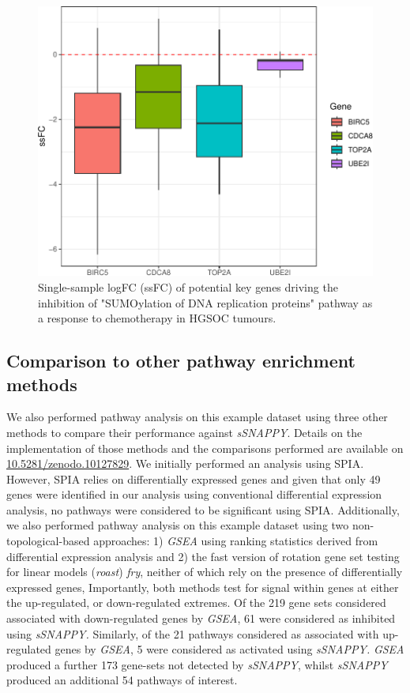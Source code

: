 \documentclass[9pt,a4paper,]{extarticle}
\begin{document}
\begin{figure}

{\centering \includegraphics[width=0.8\linewidth]{sSNAPPY_paper_files/figure-latex/Figure8-1} 

}

\caption{Single-sample logFC (ssFC) of potential key genes driving the inhibition of "SUMOylation of DNA replication proteins" pathway as a response to chemotherapy in HGSOC tumours.}\label{fig:Figure8}
\end{figure}

\hypertarget{comparison-to-other-pathway-enrichment-methods}{%
\subsection{Comparison to other pathway enrichment methods}\label{comparison-to-other-pathway-enrichment-methods}}

We also performed pathway analysis on this example dataset using three other methods to compare their performance against \emph{sSNAPPY}.
Details on the implementation of those methods and the comparisons performed are available on \href{https://zenodo.org/doi/10.5281/zenodo.10059951}{10.5281/zenodo.10127829}.
We initially performed an analysis using SPIA\citep{Tarca2009}.
However, SPIA relies on differentially expressed genes and given that only 49 genes were identified in our analysis using conventional differential expression analysis, no pathways were considered to be significant using SPIA.
Additionally, we also performed pathway analysis on this example dataset using two non-topological-based approaches: 1) \emph{GSEA}\citep{Subramanian2005-lx} using ranking statistics derived from differential expression analysis and 2) the fast version of rotation gene set testing for linear models (\emph{roast})\citep{wu2010roast} \emph{fry}, neither of which rely on the presence of differentially expressed genes,
Importantly, both methods test for signal within genes at either the up-regulated, or down-regulated extremes.
Of the 219 gene sets considered associated with down-regulated genes by \emph{GSEA}, 61 were considered as inhibited using \emph{sSNAPPY.}
Similarly, of the 21 pathways considered as associated with up-regulated genes by \emph{GSEA}, 5 were considered as activated using \emph{sSNAPPY.}
\emph{GSEA} produced a further 173 gene-sets not detected by \emph{sSNAPPY}, whilst \emph{sSNAPPY} produced an additional 54 pathways of interest.
\end{document}
